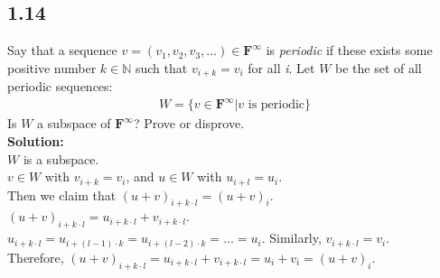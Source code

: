 \documentclass{article}
\begin{document}
\subsection{1.14}
Say that a sequence $v = (v_1, v_2, v_3, ...) \in \textbf{F}^\infty$ is \textit{periodic} if these exists some positive number $k \in \mathbb{N}$ such that $v_{i+k}=v_i$ for all \textit{i}. Let $W$ be the set of all periodic sequences:
    \begin{align*}
        W=\{v \in \textbf{F}^\infty|v \textrm{ is periodic}\}
    \end{align*}
Is $W$ a subspace of $\textbf{F}^\infty$? Prove or disprove.\\
\textbf{Solution:}\\
$W$ is a subspace.\\
$v \in W$ with $v_{i+k} = v_i$, and $u \in W$ with $u_{i+l} = u_i$.\\
Then we claim that $(u+v)_{i+k\cdot l} = (u+v)_i$.\\
$(u+v)_{i+k\cdot l} = u_{i+k\cdot l} + v_{i+k\cdot l}$.\\
$u_{i+k\cdot l} = u_{i+(l-1)\cdot k} = u_{i+(l-2)\cdot k} = ... = u_i$. Similarly, $v_{i+k\cdot l} = v_i$.\\
Therefore, $(u+v)_{i + k\cdot l} = u_{i+k\cdot l} + v_{i+k\cdot l} = u_i + v_i = (u+v)_i$.\\
\end{document}
